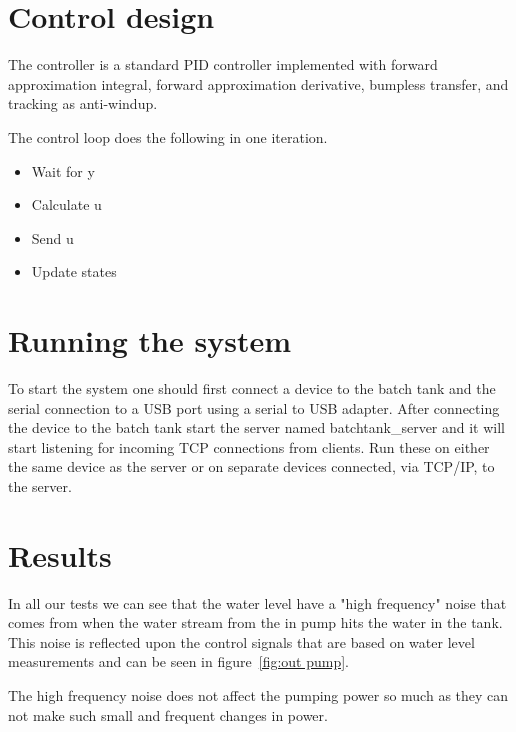 \documentclass{article}
\begin{document}
\section{Control design}
The controller is a standard PID controller implemented with forward approximation integral, forward approximation derivative, bumpless transfer, and tracking as anti-windup.

The control loop does the following in one iteration.
\begin{itemize}
\item{Wait for y}
\item{Calculate u}
\item{Send u}
\item{Update states}
\end{itemize}


\section{Running the system}
To start the system one should first connect a device to the batch tank and the
serial connection to a USB port using a serial to USB adapter. After connecting
the device to the batch tank start the server named batchtank\_server and it will
start listening for incoming TCP connections from clients. Run these on either
the same device as the server or on separate devices connected, via TCP/IP, to
the server.

\section{Results}\label{results}
In all our tests we can see that the water level have a "high frequency" noise
that comes from when the water stream from the in pump hits the water in the
tank. This noise is reflected upon the control signals that are based on water
level measurements and can be seen in figure~\ref{fig:out pump}.

The high frequency noise does not affect the pumping power so much as they can not make such small and frequent changes in power.
\end{document}
